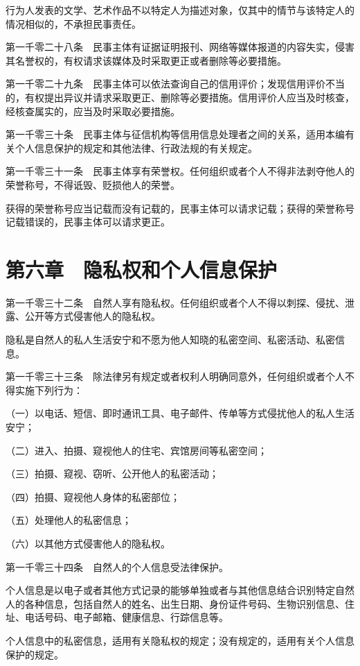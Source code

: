 \documentclass[UTF8,12pt,a4paper]{ctexbook}
\begin{document}
行为人发表的文学、艺术作品不以特定人为描述对象，仅其中的情节与该特定人的情况相似的，不承担民事责任。

第一千零二十八条　民事主体有证据证明报刊、网络等媒体报道的内容失实，侵害其名誉权的，有权请求该媒体及时采取更正或者删除等必要措施。

第一千零二十九条　民事主体可以依法查询自己的信用评价；发现信用评价不当的，有权提出异议并请求采取更正、删除等必要措施。信用评价人应当及时核查，经核查属实的，应当及时采取必要措施。

第一千零三十条　民事主体与征信机构等信用信息处理者之间的关系，适用本编有关个人信息保护的规定和其他法律、行政法规的有关规定。

第一千零三十一条　民事主体享有荣誉权。任何组织或者个人不得非法剥夺他人的荣誉称号，不得诋毁、贬损他人的荣誉。

获得的荣誉称号应当记载而没有记载的，民事主体可以请求记载；获得的荣誉称号记载错误的，民事主体可以请求更正。

\section*{第六章　隐私权和个人信息保护}

第一千零三十二条　自然人享有隐私权。任何组织或者个人不得以刺探、侵扰、泄露、公开等方式侵害他人的隐私权。

隐私是自然人的私人生活安宁和不愿为他人知晓的私密空间、私密活动、私密信息。

第一千零三十三条　除法律另有规定或者权利人明确同意外，任何组织或者个人不得实施下列行为：

（一）以电话、短信、即时通讯工具、电子邮件、传单等方式侵扰他人的私人生活安宁；

（二）进入、拍摄、窥视他人的住宅、宾馆房间等私密空间；

（三）拍摄、窥视、窃听、公开他人的私密活动；

（四）拍摄、窥视他人身体的私密部位；

（五）处理他人的私密信息；

（六）以其他方式侵害他人的隐私权。

第一千零三十四条　自然人的个人信息受法律保护。

个人信息是以电子或者其他方式记录的能够单独或者与其他信息结合识别特定自然人的各种信息，包括自然人的姓名、出生日期、身份证件号码、生物识别信息、住址、电话号码、电子邮箱、健康信息、行踪信息等。

个人信息中的私密信息，适用有关隐私权的规定；没有规定的，适用有关个人信息保护的规定。
\end{document}
